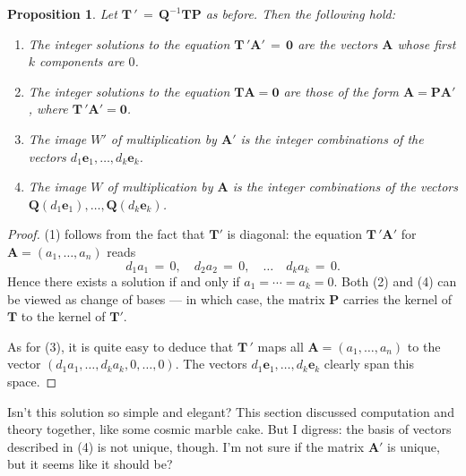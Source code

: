 \documentclass[11pt]{article}
\newtheorem{proposition}{Proposition}
\renewcommand{\vec}[1]{\mathbf{#1}}
\newcommand{\mat}[1]{\mathbf{#1}}
\begin{document}
\begin{adjustwidth}{0.5cm}{}
  \begin{proposition}
    Let $\mat{T} \, ' \, = \, \mat{Q}^{-1}\mat{T}\mat{P}$ as before. Then the following hold:
    \begin{enumerate}
      \item The integer solutions to the equation $\mat{T} \, ' \vec{A}' \, = \, \vec{0}$ are the vectors $\mat{A}$ whose first $k$ components are $0$.
      \item The integer solutions to the equation $\mat{T} \vec{A} = \vec{0}$ are those of the form $\mat{A} = \mat{P} \vec{A}'$, where $\mat{T} \, ' \vec{A}' = \vec{0}$.
      \item The image $W'$ of multiplication by $\mat{A}'$ is the integer combinations of the vectors $d_{1} \vec{e}_{1}, \ldots, d_{k} \vec{e}_{k}$.
      \item The image $W$ of multiplication by $\mat{A}$ is the integer combinations of the vectors $\mat{Q} (d_{1} \vec{e}_{1}), \ldots, \mat{Q} (d_{k} \vec{e}_{k})$.
    \end{enumerate}
  \end{proposition}
  \begin{proof}
    (1) follows from the fact that $\mat{T}'$ is diagonal: the equation $\mat{T} \, ' \vec{A}'$ for $\vec{A} = (a_{1}, \ldots, a_{n})$ reads
    \[
      d_{1}a_{1} \, = \, 0, \quad d_{2}a_{2} \, = \, 0, \quad \ldots \quad d_{k}a_{k} \, = \, 0.
    \]
    Hence there exists a solution if and only if $a_{1} = \cdots = a_{k} = 0$. Both (2) and (4) can be viewed as change of bases --- in which case, the matrix $\mat{P}$ carries the kernel of $\mat{T}$ to the kernel of $\mat{T}'$.

    As for (3), it is quite easy to deduce that $\mat{T} \, '$ maps all $\vec{A} = (a_{1}, \ldots, a_{n})$ to the vector $(d_{1}a_{1}, \ldots, d_{k}a_{k}, 0, \ldots, 0)$. The vectors $d_{1} \vec{e}_{1}, \ldots, d_{k} \vec{e}_{k}$ clearly span this space.
  \end{proof}
\end{adjustwidth}

Isn't this solution so simple and elegant? This section discussed computation and theory together, like some cosmic marble cake. But I digress: the basis of vectors described in (4) is not unique, though. I'm not sure if the matrix $\mat{A}'$ is unique, but it seems like it should be?

\end{document}
